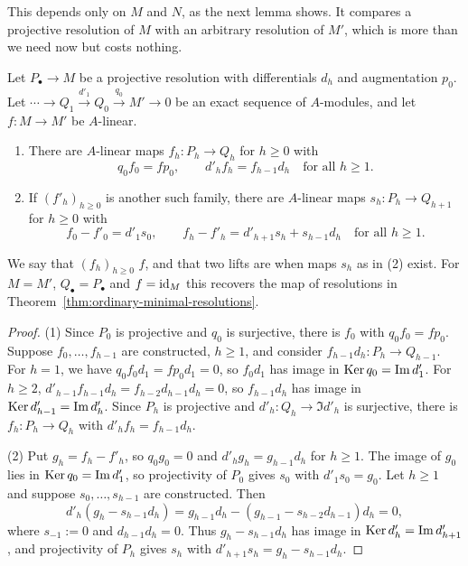 This depends only on $M$ and $N$, as the next lemma shows.
It compares a projective resolution of $M$ with an arbitrary resolution of $M'$, which is more than we need now but costs nothing.

\begin{lemma}[Comparison]\label{lem:comparison}
Let $P_\bullet\to M$ be a projective resolution with differentials $d_h$ and augmentation $p_0$.
Let $\cdots\to Q_1\xrightarrow{d'_1}Q_0\xrightarrow{q_0}M'\to0$ be an exact sequence of $A$-modules, and let $f:M\to M'$ be $A$-linear.
\begin{enumerate}
\item There are $A$-linear maps $f_h:P_h\to Q_h$ for $h\geq0$ with
\[
q_0f_0=fp_0,\qquad d'_hf_h=f_{h-1}d_h\quad\text{for all }h\geq1.
\]
\item If $(f'_h)_{h\geq0}$ is another such family, there are $A$-linear maps $s_h:P_h\to Q_{h+1}$ for $h\geq0$ with
\[
f_0-f'_0=d'_1s_0,\qquad f_h-f'_h=d'_{h+1}s_h+s_{h-1}d_h\quad\text{for all }h\geq1.
\]
\end{enumerate}
\end{lemma}

We say that $(f_h)_{h\geq0}$  $f$, and that two lifts are  when maps $s_h$ as in (2) exist.
For $M=M'$, $Q_\bullet=P_\bullet$ and $f=\operatorname{id}_M$ this recovers the map of resolutions in Theorem~\ref{thm:ordinary-minimal-resolutions}.

\begin{supplementary}
\begin{proof}
(1) Since $P_0$ is projective and $q_0$ is surjective, there is $f_0$ with $q_0f_0=fp_0$.
Suppose $f_0,\ldots,f_{h-1}$ are constructed, $h\geq1$, and consider $f_{h-1}d_h:P_h\to Q_{h-1}$.
For $h=1$, we have $q_0f_0d_1=fp_0d_1=0$, so $f_0d_1$ has image in $\operatorname{Ker}\nolimits q_0=\operatorname{Im}\nolimits d'_1$.
For $h\geq2$, $d'_{h-1}f_{h-1}d_h=f_{h-2}d_{h-1}d_h=0$, so $f_{h-1}d_h$ has image in $\operatorname{Ker}\nolimits d'_{h-1}=\operatorname{Im}\nolimits d'_h$.
Since $P_h$ is projective and $d'_h:Q_h\to\Im d'_h$ is surjective, there is $f_h:P_h\to Q_h$ with $d'_hf_h=f_{h-1}d_h$.

(2) Put $g_h=f_h-f'_h$, so $q_0g_0=0$ and $d'_hg_h=g_{h-1}d_h$ for $h\geq1$.
The image of $g_0$ lies in $\operatorname{Ker}\nolimits q_0=\operatorname{Im}\nolimits d'_1$, so projectivity of $P_0$ gives $s_0$ with $d'_1s_0=g_0$.
Let $h\geq1$ and suppose $s_0,\ldots,s_{h-1}$ are constructed.
Then
\[
d'_h(g_h-s_{h-1}d_h)=g_{h-1}d_h-(g_{h-1}-s_{h-2}d_{h-1})d_h=0,
\]
where $s_{-1}:=0$ and $d_{h-1}d_h=0$.
Thus $g_h-s_{h-1}d_h$ has image in $\operatorname{Ker}\nolimits d'_h=\operatorname{Im}\nolimits d'_{h+1}$, and projectivity of $P_h$ gives $s_h$ with $d'_{h+1}s_h=g_h-s_{h-1}d_h$.
\end{proof}
\end{supplementary}

